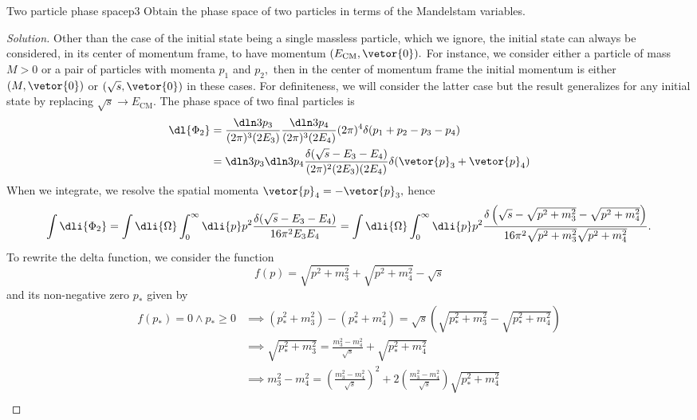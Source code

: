 \begin{problem}{Two particle phase space}{p3}
   Obtain the phase space of two particles in terms of the Mandelstam variables.
\end{problem}
\begin{proof}[Solution]
   Other than the case of the initial state being a single massless particle, which we ignore, the initial state can always be considered, in its center of momentum frame, to have momentum \((E_\mathrm{CM}, \vetor{0}).\) For instance, we consider either a particle of mass \(M > 0\) or a pair of particles with momenta \(p_1\) and \(p_2,\) then in the center of momentum frame the initial momentum is either \((M, \vetor{0})\) or \((\sqrt{s}, \vetor{0})\) in these cases. For definiteness, we will consider the latter case but the result generalizes for any initial state by replacing \(\sqrt{s} \to E_{\mathrm{CM}}\). The phase space of two final particles is
   \begin{align*}
      \dl{\Phi_2} &= \frac{\dln3{p_3}}{(2\pi)^3 (2 E_3)}\frac{\dln3{p_4}}{(2\pi)^3 (2 E_4)} (2\pi)^4 \delta(p_1 + p_2 - p_3 - p_4)\\
                  &= \dln3{p_3} \dln3{p_4} \frac{\delta(\sqrt{s} - E_3 - E_4)}{(2\pi)^2 (2 E_3) (2E_4)}\delta(\vetor{p}_3 + \vetor{p}_4)
   \end{align*}
   When we integrate, we resolve the spatial momenta \(\vetor{p}_4 = - \vetor{p}_3,\) hence
   \begin{equation*}
      \int \dli{\Phi_2} = \int\dli{\Omega} \int_0^\infty \dli{p} p^2\frac{\delta(\sqrt{s} - E_3 - E_4)}{16\pi^2 E_3 E_4} = \int \dli{\Omega} \int_0^\infty \dli{p} p^2\frac{\delta\left(\sqrt{s} - \sqrt{p^2 + m_3^2} - \sqrt{p^2 + m_4^2}\right)}{16\pi^2 \sqrt{p^2 + m_3^2} \sqrt{p^2 + m_4^2}}.
   \end{equation*}
   To rewrite the delta function, we consider the function
   \begin{equation*}
      f(p) = \sqrt{p^2 + m_3^2} + \sqrt{p^2 + m_4^2} - \sqrt{s}
   \end{equation*}
   and its non-negative zero \(p_*\) given by
   \begin{align*}
      f(p_*) = 0 \land p_* \geq 0 &\implies (p_*^2 + m_3^2) - (p_*^2 + m_4^2) = \sqrt{s}\left(\sqrt{p_*^2 + m_3^2} - \sqrt{p_*^2 + m_4^2}\right)\\
                                  &\implies \sqrt{p_*^2 + m_3^2} = \frac{m_3^2 - m_4^2}{\sqrt{s}} + \sqrt{p_*^2 + m_4^2}\\
                                  &\implies m_3^2 - m_4^2 = \left(\frac{m_3^2 - m_4^2}{\sqrt{s}}\right)^2 + 2\left(\frac{m_3^2 - m_4^2}{\sqrt{s}}\right)\sqrt{p_*^2 + m_4^2}\\

\end{align*}
\end{proof}
